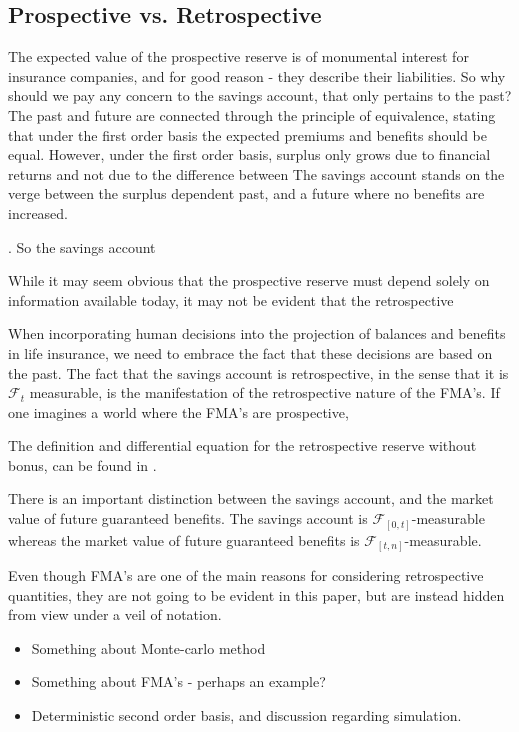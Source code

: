 \documentclass[12pt]{article}
\theoremstyle{my_thm}
\begin{document}
\subsection{Prospective vs. Retrospective}
The expected value of the prospective reserve is of monumental interest for insurance companies, and for good reason - they describe their liabilities. So why should we pay any concern to the savings account, that only pertains to the past? The past and future are connected through the principle of equivalence, stating that under the first order basis the expected premiums and benefits should be equal. However, under the first order basis, surplus only grows due to financial returns and not due to the difference between
The savings account stands on the verge between the surplus dependent past, and a future where no benefits are increased.


. So the savings account 

While it may seem obvious that the prospective reserve must depend solely on information available today, it may not be evident that the retrospective

When incorporating human decisions into the projection of balances and benefits in life insurance, we need to embrace the fact that these decisions are based on the past. The fact that the savings account is retrospective, in the sense that it is $\mathcal{F}_t$ measurable, is the manifestation of the retrospective nature of the FMA's. If one imagines a world where the FMA's are prospective, 

The definition and differential equation for the retrospective reserve without bonus, can be found in \citet{Norberg}. 

There is an important distinction between the savings account, and the market value of future guaranteed benefits. The savings account is $\mathcal{F}_{[0,t]}$-measurable whereas the market value of future guaranteed benefits is $\mathcal{F}_{[t,n]}$-measurable.

 Even though FMA's are one of the main reasons for considering retrospective quantities, they are not going to be evident in this paper, but are instead hidden from view under a veil of notation. 

\begin{itemize}
\item Something about Monte-carlo method
\item Something about FMA's - perhaps an example?
\item Deterministic second order basis, and discussion regarding simulation.
\end{itemize}
\end{document}
